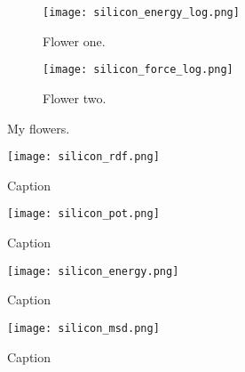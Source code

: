 \begin{figure}[!tbp]
\begin{adjustbox}{max width=1.2\linewidth,center}
\centering
  \begin{subfigure}[b]{0.55\textwidth}
      \texttt{[image: silicon\_energy\_log.png]}
    \caption{Flower one.}
    \label{fig:f1}
  \end{subfigure}
  \hfill
  \begin{subfigure}[b]{0.55\textwidth}
      \texttt{[image: silicon\_force\_log.png]}
    \caption{Flower two.}
    \label{fig:f2}
  \end{subfigure}
\end{adjustbox}
\caption{My flowers.}
    \label{fig:default}
\end{figure}

\begin{figure}
    \centering
    \texttt{[image: silicon\_rdf.png]}
    \caption{Caption}
    \label{fig:silicon-rdf}
\end{figure}

\begin{figure}
    \centering
    \texttt{[image: silicon\_pot.png]}
    \caption{Caption}
    \label{fig:silicon-energy}
\end{figure}

\begin{figure}
    \centering
    \texttt{[image: silicon\_energy.png]}
    \caption{Caption}
    \label{fig:silicon-energy}
\end{figure}

\begin{figure}
    \centering
    \texttt{[image: silicon\_msd.png]}
    \caption{Caption}
    \label{fig:silicon-energy}
\end{figure}

